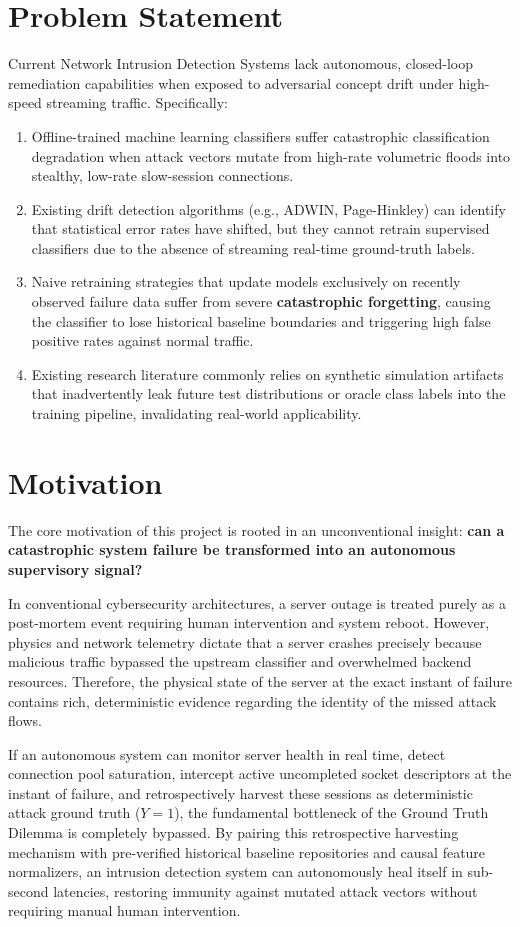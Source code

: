 \documentclass[12pt,a4paper,oneside]{report}
\begin{document}
\section{Problem Statement}
Current Network Intrusion Detection Systems lack autonomous, closed-loop remediation capabilities when exposed to adversarial concept drift under high-speed streaming traffic. Specifically:
\begin{enumerate}
    \item Offline-trained machine learning classifiers suffer catastrophic classification degradation when attack vectors mutate from high-rate volumetric floods into stealthy, low-rate slow-session connections.
    \item Existing drift detection algorithms (e.g., ADWIN, Page-Hinkley) can identify that statistical error rates have shifted, but they cannot retrain supervised classifiers due to the absence of streaming real-time ground-truth labels.
    \item Naive retraining strategies that update models exclusively on recently observed failure data suffer from severe \textbf{catastrophic forgetting}, causing the classifier to lose historical baseline boundaries and triggering high false positive rates against normal traffic.
    \item Existing research literature commonly relies on synthetic simulation artifacts that inadvertently leak future test distributions or oracle class labels into the training pipeline, invalidating real-world applicability.
\end{enumerate}

\section{Motivation}
The core motivation of this project is rooted in an unconventional insight: \textbf{can a catastrophic system failure be transformed into an autonomous supervisory signal?}

In conventional cybersecurity architectures, a server outage is treated purely as a post-mortem event requiring human intervention and system reboot. However, physics and network telemetry dictate that a server crashes precisely because malicious traffic bypassed the upstream classifier and overwhelmed backend resources. Therefore, the physical state of the server at the exact instant of failure contains rich, deterministic evidence regarding the identity of the missed attack flows.

If an autonomous system can monitor server health in real time, detect connection pool saturation, intercept active uncompleted socket descriptors at the instant of failure, and retrospectively harvest these sessions as deterministic attack ground truth ($Y=1$), the fundamental bottleneck of the Ground Truth Dilemma is completely bypassed. By pairing this retrospective harvesting mechanism with pre-verified historical baseline repositories and causal feature normalizers, an intrusion detection system can autonomously heal itself in sub-second latencies, restoring immunity against mutated attack vectors without requiring manual human intervention.
\end{document}

